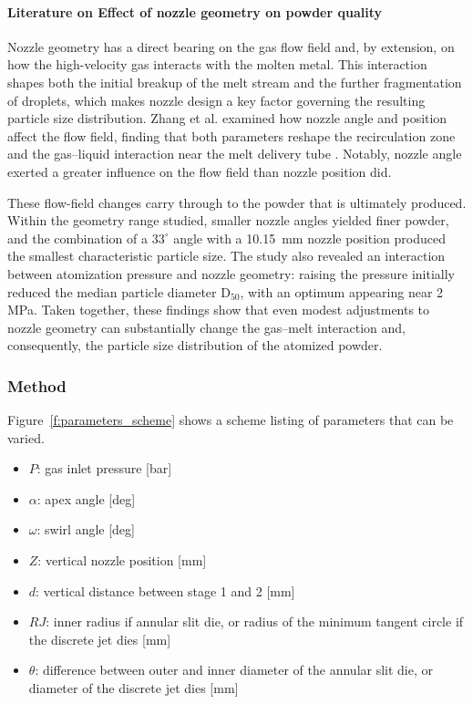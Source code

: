 \documentclass[../../main.tex]{subfiles}
\begin{document}
\paragraph{Literature on Effect of nozzle geometry on powder quality}

Nozzle geometry has a direct bearing on the gas flow field and, by extension, on how the high-velocity gas interacts with the molten metal. This interaction shapes both the initial breakup of the melt stream and the further fragmentation of droplets, which makes nozzle design a key factor governing the resulting particle size distribution. Zhang et al. examined how nozzle angle and position affect the flow field, finding that both parameters reshape the recirculation zone and the gas–liquid interaction near the melt delivery tube \cite{Zhang2026NumericalAnalysis}. Notably, nozzle angle exerted a greater influence on the flow field than nozzle position did.

These flow-field changes carry through to the powder that is ultimately produced. Within the geometry range studied, smaller nozzle angles yielded finer powder, and the combination of a $33^\circ$ angle with a 10.15~mm nozzle position produced the smallest characteristic particle size. The study also revealed an interaction between atomization pressure and nozzle geometry: raising the pressure initially reduced the median particle diameter D$_{50}$, with an optimum appearing near 2 MPa. Taken together, these findings show that even modest adjustments to nozzle geometry can substantially change the gas–melt interaction and, consequently, the particle size distribution of the atomized powder.

\subsubsection{Method}

Figure~\ref{f:parameters_scheme} shows a scheme listing of parameters that can be varied.

\begin{itemize}
    \item $P$: gas inlet pressure [bar]
    \item $\alpha$: apex angle [deg]
    \item $\omega$: swirl angle [deg]
    \item $Z$: vertical nozzle position [mm]
    \item $d$: vertical distance between stage 1 and 2 [mm]
    \item $RJ$: inner radius if annular slit die, or radius of the minimum tangent circle if the discrete jet dies [mm]
    \item $\theta$: difference between outer and inner diameter of the annular slit die, or diameter of the discrete jet dies [mm]
\end{itemize}
\end{document}
